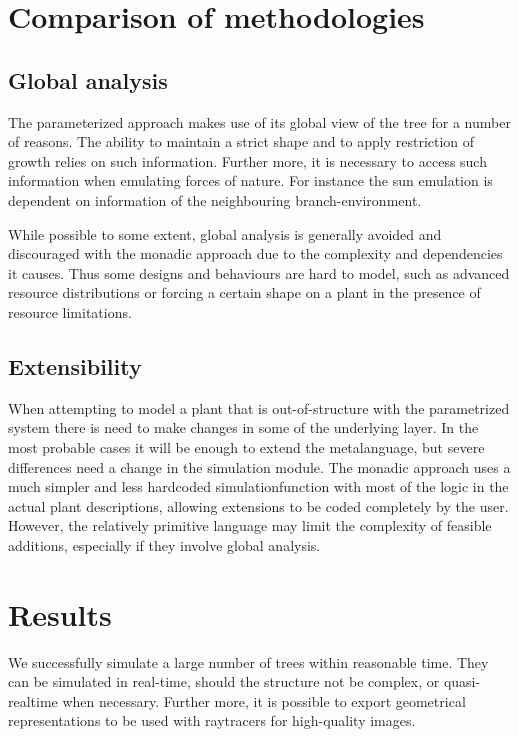 
\section{Comparison of methodologies}


\subsection{Global analysis}


    The  parameterized approach makes use of its global view of the
    tree for a number of reasons. The ability to maintain a strict
    shape and to apply restriction of growth relies on such
    information. Further more, it is necessary to access such
    information when emulating forces of nature. For instance the sun
    emulation is dependent on information of the neighbouring
    branch-environment.

    While possible to some extent, global analysis is generally
    avoided and discouraged with the monadic approach due to the
    complexity and dependencies it causes. Thus some designs and
    behaviours are hard to model, such as advanced resource
    distributions or forcing a certain shape on a plant in the
    presence of resource limitations.


\subsection{Extensibility}

    When attempting to model a plant that is out-of-structure with the
    parametrized system there is need to make changes in some of the
    underlying layer. In the most probable cases it will be enough to
    extend the metalanguage, but severe differences need a change in
    the simulation module. The monadic approach uses a much simpler
    and less hardcoded simulationfunction with most of the logic in
    the actual plant descriptions, allowing extensions to be coded
    completely by the user. However, the relatively primitive language
    may limit the complexity of feasible additions, especially if they
    involve global analysis.

\newpage
\section{Results}

    We successfully simulate a large number of trees within reasonable
    time. They can be simulated in real-time, should the structure not
    be complex, or quasi-realtime when necessary. Further more, it is
    possible to export geometrical representations to be used with
    raytracers for high-quality images.
    




